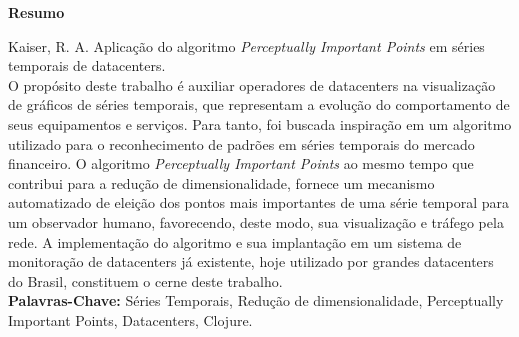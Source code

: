 \begin{titlepage}
\begin{center}
  \Large
  \textbf{Resumo}
\end{center}
Kaiser, R. A. Aplicação do algoritmo \textit{Perceptually Important Points} em séries temporais de datacenters.\\

O propósito deste trabalho é auxiliar operadores de datacenters na visualização de gráficos de séries temporais, que representam a evolução do comportamento de seus equipamentos e serviços. Para tanto, foi buscada inspiração em um algoritmo utilizado para o reconhecimento de padrões em séries temporais do mercado financeiro. O algoritmo \textit{Perceptually Important Points} ao mesmo tempo que contribui para a redução de dimensionalidade, fornece um mecanismo automatizado de eleição dos pontos mais importantes de uma série temporal para um observador humano, favorecendo, deste modo, sua visualização e tráfego pela rede. A implementação do algoritmo e sua implantação em um sistema de monitoração de datacenters já existente, hoje utilizado por grandes datacenters do Brasil, constituem o cerne deste trabalho. \\

\textbf{Palavras-Chave:} Séries Temporais, Redução de dimensionalidade, Perceptually Important Points, Datacenters, Clojure.

\end{titlepage}
